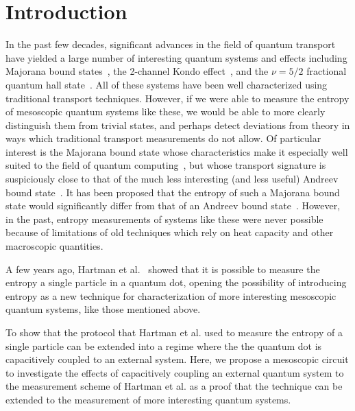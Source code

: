 
\chapter{Introduction}
\label{ch:Introduction}


In the past few decades, significant advances in the field of quantum transport have yielded a large number of interesting quantum systems and effects including Majorana bound states~\cite{frolovmajorana}, the 2-channel Kondo effect~\cite{goldhaber-2ck}, and the $\nu = 5/2$ fractional quantum hall state~\cite{Eisenstein5_2}. All of these systems have been well characterized using traditional transport techniques. However, if we were able to measure the entropy of mesoscopic quantum systems like these, we would be able to more clearly distinguish them from trivial states, and perhaps detect deviations from theory in ways which traditional transport measurements do not allow. Of particular interest is the Majorana bound state whose characteristics make it especially well suited to the field of quantum computing~\cite{simon, kitaev}, but whose transport signature is suspiciously close to that of the much less interesting (and less useful) Andreev bound state~\cite{frolov_mirage}. It has been proposed that the entropy of such a Majorana bound state would significantly differ from that of an Andreev bound state~\cite{majorana_fractional}. However, in the past, entropy measurements of systems like these were never possible because of limitations of old techniques which rely on heat capacity and other macroscopic quantities.

A few years ago, Hartman et al.~\cite{nikentropy} showed that it is possible to measure the entropy a single \spinh particle in a quantum dot, opening the possibility of introducing entropy as a new technique for characterization of more interesting mesoscopic quantum systems, like those mentioned above.  

To show that the protocol that Hartman et al. used to measure the entropy of a single \spinh particle can be extended into a regime where the the quantum dot is capacitively coupled to an external system. Here, we propose a mesoscopic circuit to investigate the effects of capacitively coupling an external quantum system to the measurement scheme of Hartman et al. as a proof that the technique can be extended to the measurement of more interesting quantum systems.
\endinput

Any text after an \endinput is ignored.
You could put scraps here or things in progress.
